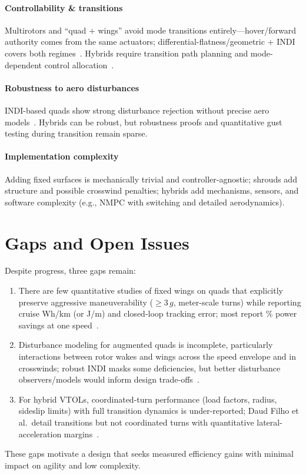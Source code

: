 \paragraph{Controllability \& transitions}
Multirotors and ``quad + wings'' avoid mode transitions entirely---hover/forward authority comes from the same actuators; differential-flatness/geometric + INDI covers both regimes~\cite{Lee2010,Tal2018}.
Hybrids require transition path planning and mode-dependent control allocation~\cite{DaudFilho2024,Misra2022}.

\paragraph{Robustness to aero disturbances}
INDI-based quads show strong disturbance rejection without precise aero models~\cite{Sieberling2010,Smeur2017,Sun2021}.
Hybrids can be robust, but robustness proofs and quantitative gust testing during transition remain sparse.

\paragraph{Implementation complexity}
Adding fixed surfaces is mechanically trivial and controller-agnostic; shrouds add structure and possible crosswind penalties; hybrids add mechanisms, sensors, and software complexity (e.g., NMPC with switching and detailed aerodynamics).


\section{Gaps and Open Issues}

Despite progress, three gaps remain:
\begin{enumerate}
  \item There are few quantitative studies of fixed wings on quads that explicitly preserve aggressive maneuverability ($\geq 3\,g$, meter-scale turns) while reporting cruise Wh/km (or J/m) and closed-loop tracking error; most report \% power savings at one speed~\cite{Dawkins2018,Xiao2020}.
  \item Disturbance modeling for augmented quads is incomplete, particularly interactions between rotor wakes and wings across the speed envelope and in crosswinds; robust INDI masks some deficiencies, but better disturbance observers/models would inform design trade-offs~\cite{Sun2021}.
  \item For hybrid VTOLs, coordinated-turn performance (load factors, radius, sideslip limits) with full transition dynamics is under-reported; Daud Filho et al.\ detail transitions but not coordinated turns with quantitative lateral-acceleration margins~\cite{DaudFilho2024}.
\end{enumerate}
These gaps motivate a design that seeks measured efficiency gains with minimal impact on agility and low complexity.



